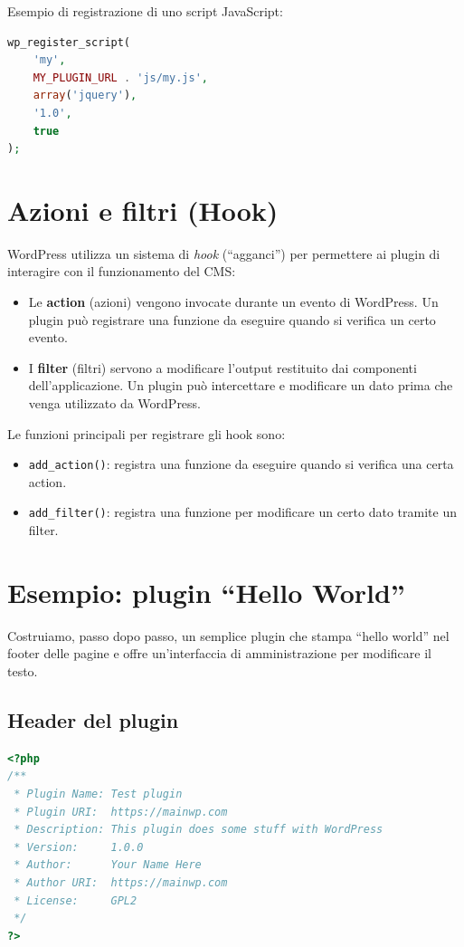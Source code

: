 Esempio di registrazione di uno script JavaScript:

\begin{lstlisting}[language=PHP]
wp_register_script(
    'my',
    MY_PLUGIN_URL . 'js/my.js',
    array('jquery'),
    '1.0',
    true
);
\end{lstlisting}

\section{Azioni e filtri (Hook)}

WordPress utilizza un sistema di \emph{hook} (``agganci'') per permettere ai plugin di interagire con il funzionamento del CMS:

\begin{itemize}
    \item Le \textbf{action} (azioni) vengono invocate durante un evento di WordPress. Un plugin può registrare una funzione da eseguire quando si verifica un certo evento.
    \item I \textbf{filter} (filtri) servono a modificare l'output restituito dai componenti dell'applicazione. Un plugin può intercettare e modificare un dato prima che venga utilizzato da WordPress.
\end{itemize}

Le funzioni principali per registrare gli hook sono:

\begin{itemize}
    \item \texttt{add\_action()}: registra una funzione da eseguire quando si verifica una certa action.
    \item \texttt{add\_filter()}: registra una funzione per modificare un certo dato tramite un filter.
\end{itemize}

\section{Esempio: plugin ``Hello World''}

Costruiamo, passo dopo passo, un semplice plugin che stampa ``hello world'' nel footer delle pagine e offre un'interfaccia di amministrazione per modificare il testo.

\subsection{Header del plugin}

\begin{lstlisting}[language=PHP]
<?php
/**
 * Plugin Name: Test plugin
 * Plugin URI:  https://mainwp.com
 * Description: This plugin does some stuff with WordPress
 * Version:     1.0.0
 * Author:      Your Name Here
 * Author URI:  https://mainwp.com
 * License:     GPL2
 */
?>
\end{lstlisting}

